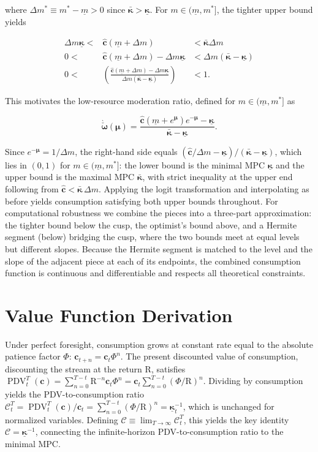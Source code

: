 \documentclass[preprint,authoryear]{elsarticle}
\newcommand{\mNrm}{m}
\newcommand{\Rfree}{\text{R}}
\newcommand{\AbsPatFac}{\Phi}
\newcommand{\cFunc}{\mathbf{c}}
\newcommand{\MPC}{\boldsymbol{\kappa}}
\newcommand{\MPCmin}{\underline{\MPC}}
\newcommand{\mNrmMin}{\underline{\mNrm}}
\newcommand{\mNrmEx}{\Delta \mNrm}
\newcommand{\cFuncReal}{\hat{\cFunc}}
\newcommand{\modRte}{\boldsymbol{\omega}}
\newcommand{\logmNrmEx}{\boldsymbol{\mu}}
\newcommand{\MPCmax}{\bar{\MPC}}
\newcommand{\mNrmCusp}{\mNrm^*}
\newcommand{\mNrmCuspEx}{\Delta \mNrm^*}
\newcommand{\modRteLoTightUpBd}{\grave{\check{\modRte}}}
\newcommand{\cLvl}{\mathbf{c}}
\newcommand{\PDV}{\operatorname{PDV}}
\newcommand{\PDVCoverc}{\mathcal{C}}
\begin{document}
where $\mNrmCuspEx\equiv\mNrmCusp -\mNrmMin > 0$ since $\MPCmax > \MPCmin$. For $\mNrm \in (\mNrmMin, \mNrmCusp]$, the tighter upper bound yields

\begin{equation}
\begin{array}{rcl}
\mNrmEx \MPCmin < & \cFuncReal(\mNrmMin+\mNrmEx) & < \MPCmax \mNrmEx \\
0 < & \cFuncReal(\mNrmMin+\mNrmEx) - \mNrmEx \MPCmin & < \mNrmEx(\MPCmax- \MPCmin) \\
0 < & \left(\frac{\cFuncReal(\mNrmMin+\mNrmEx) - \mNrmEx \MPCmin}{\mNrmEx(\MPCmax- \MPCmin)}\right) & < 1.
\end{array}
\end{equation}

This motivates the low-resource moderation ratio, defined for $\mNrm \in (\mNrmMin,\mNrmCusp]$ as

\begin{equation}
\label{eq:modRteLoTightUpBd}
\modRteLoTightUpBd(\logmNrmEx) = \frac{\cFuncReal(\mNrmMin+e^{\logmNrmEx})e^{-\logmNrmEx}-\MPCmin}{\MPCmax-\MPCmin}.
\end{equation}

Since $e^{ -\logmNrmEx} = 1/\mNrmEx$, the right-hand side equals $(\cFuncReal/\mNrmEx - \MPCmin)/(\MPCmax - \MPCmin)$, which lies in $(0,1)$ for $\mNrm \in (\mNrmMin,\mNrmCusp]$: the lower bound is the minimal MPC $\MPCmin$ and the upper bound is the maximal MPC $\MPCmax$, with strict inequality at the upper end following from $\cFuncReal < \MPCmax\,\mNrmEx$. Applying the logit transformation and interpolating as before yields consumption satisfying both upper bounds throughout. For computational robustness we combine the pieces into a three-part approximation: the tighter bound below the cusp, the optimist's bound above, and a Hermite segment (below) bridging the cusp, where the two bounds meet at equal levels but different slopes. Because the Hermite segment is matched to the level and the slope of the adjacent piece at each of its endpoints, the combined consumption function is continuous and differentiable and respects all theoretical constraints.

\section{Value Function Derivation}

Under perfect foresight, consumption grows at constant rate equal to the absolute patience factor $\AbsPatFac$: $\cLvl_{t+n}=\cLvl_{t}\AbsPatFac^{n}$. The present discounted value of consumption, discounting the stream at the return $\Rfree$, satisfies $\PDV_{t}^{T}(\cLvl)=\sum_{n=0}^{T -t}\Rfree^{ -n}\cLvl_{t}\AbsPatFac^{n}=\cLvl_{t}\sum_{n=0}^{T -t}(\AbsPatFac/\Rfree)^{n}$. Dividing by consumption yields the PDV-to-consumption ratio $\PDVCoverc_{t}^{T}=\PDV_{t}^{T}(\cLvl)/\cLvl_{t}=\sum_{n=0}^{T -t}(\AbsPatFac/\Rfree)^{n}=\MPCmin_{t}^{ -1}$, which is unchanged for normalized variables. Defining $\PDVCoverc \equiv \lim_{T\to\infty} \PDVCoverc_{t}^{T}$, this yields the key identity $\PDVCoverc = \MPCmin^{ -1}$, connecting the infinite-horizon PDV-to-consumption ratio to the minimal MPC.
\end{document}
